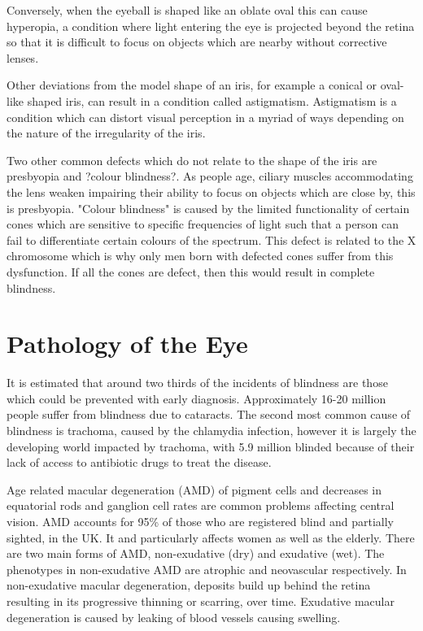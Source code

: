 Conversely, when the eyeball is shaped like an oblate oval this can cause
hyperopia, a condition where light entering the eye is projected beyond the
retina so that it is difficult to focus on objects which are nearby without
corrective lenses.

Other deviations from the model shape of an iris, for example a conical
or oval-like shaped iris, can result in a condition called astigmatism.
Astigmatism is a condition which can distort visual perception in a myriad
of ways depending on the nature of the irregularity of the iris.

Two other common defects which do not relate to the shape of the iris are
presbyopia and ?colour blindness?. As people age, ciliary muscles
accommodating the  lens weaken impairing their ability to focus on objects
which are close by, this is presbyopia. \cite{fisher1985ciliary} "Colour
blindness" is caused by the limited functionality of certain cones which are
sensitive to specific frequencies of light such that a person can fail to
differentiate certain colours of the spectrum. This defect is related to the X
chromosome which is why only men born with defected cones suffer from
this dysfunction.\cite{george1996clinical} If all the cones are defect, then
this would result in complete blindness.

\section{Pathology of the Eye}

It is estimated that around two thirds of the incidents of blindness are those
which could be prevented with early diagnosis.\cite{west2000looking}
Approximately 16-20 million people suffer from blindness due to
cataracts.\cite{west2000looking} The second most common cause of
blindness is trachoma, caused by the chlamydia infection, however it is
largely the developing world impacted by trachoma, with 5.9 million blinded
because of their lack of access to antibiotic drugs to treat the disease.
\cite{west2000looking}

Age related macular degeneration (AMD) of pigment cells and
decreases in equatorial rods and ganglion cell rates are common
problems affecting central vision.\cite{gao1992aging} AMD accounts
for 95\% of those who are registered blind and partially sighted, in the UK.
It and particularly affects women as well as the elderly.
\cite{o1998age,klein2005complement,west2000looking}
There are two main forms of AMD, non-exudative (dry) and exudative
(wet). The phenotypes in non-exudative AMD are atrophic and neovascular
respectively.\cite{kuno2011dry} In non-exudative macular degeneration,
deposits build up behind the retina resulting in its progressive thinning or
scarring, over time. Exudative macular degeneration is caused
by leaking of blood vessels causing swelling.

